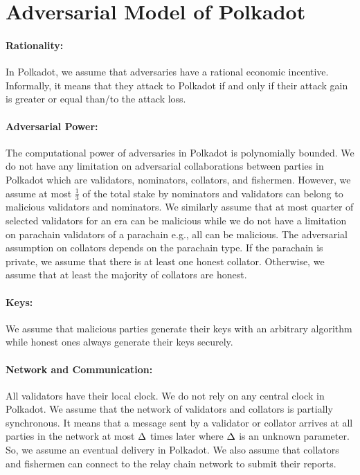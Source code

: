 \section{Adversarial Model of Polkadot}

\paragraph{Rationality:} In Polkadot, we assume that adversaries have a rational economic incentive. Informally, it means that they attack to Polkadot if and only if their attack gain is greater or equal than/to the attack loss. 

\paragraph{Adversarial Power:} The computational power of adversaries in Polkadot is polynomially bounded.  We do not have any limitation on adversarial collaborations between parties in Polkadot which are validators, nominators, collators, and fishermen. However, we assume at most $\frac{1}{3}$ of the total stake by nominators and validators can belong to malicious validators and nominators. 
We similarly assume that at most quarter of selected validators for an era can be malicious while we do not have a limitation on parachain validators of a parachain e.g., all can be malicious.  
The adversarial assumption on collators depends on the parachain type. If the parachain is private, we assume that there is at least one honest collator. Otherwise, we assume that at least the majority of collators are honest.

\paragraph{Keys:} We assume that malicious parties generate their keys with an arbitrary algorithm while honest ones always generate their keys securely.

\paragraph{Network and Communication:} All validators have their local clock. We do not rely on any central clock in Polkadot. We assume that the network of validators and collators is partially synchronous. It means that a message sent by a validator or collator arrives at all parties in the network at most $\Delta$ times later where $\Delta$ is an unknown parameter. So, we assume an eventual delivery in Polkadot.
We also assume that collators and fishermen can connect to the relay chain network to submit their reports.
